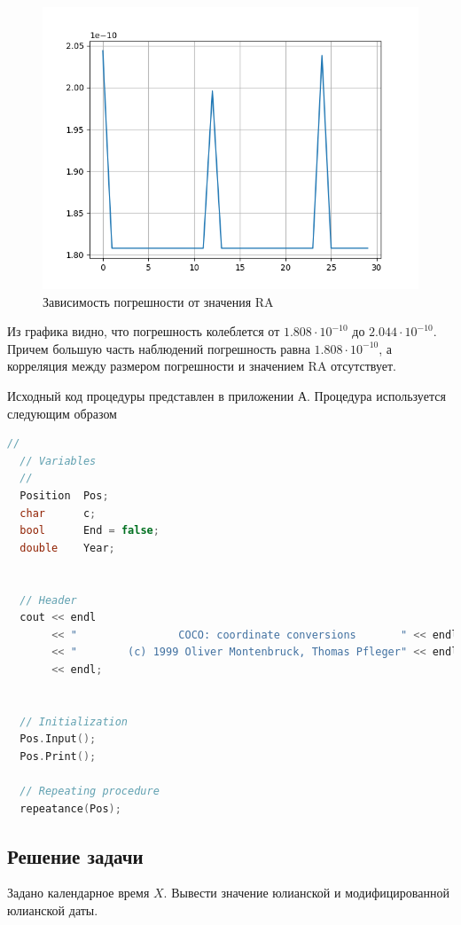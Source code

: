 \documentclass[14pt,a4paper]{extarticle}%
\begin{document}
\begin{figure}[H]
  \centering
  \includegraphics[scale=0.8]{Figure_1.png}
  \caption{Зависимость погрешности от значения RA}
  \label{fig:error}
\end{figure}

Из графика видно, что погрешность колеблется от $1.808\cdot10^{-10}$ до $2.044\cdot10^{-10}$.
Причем большую часть наблюдений погрешность равна $1.808\cdot10^{-10}$, а корреляция между
размером погрешности и значением RA отсутствует.

Исходный код процедуры представлен в приложении А.
Процедура используется следующим образом
\begin{lstlisting}[basicstyle=\small,language=c++]
  //
  // Variables
  //
  Position  Pos;
  char      c;
  bool      End = false;
  double    Year;

  
  // Header
  cout << endl
       << "                COCO: coordinate conversions       " << endl
       << "        (c) 1999 Oliver Montenbruck, Thomas Pfleger" << endl
       << endl;

  
  // Initialization   
  Pos.Input();
  Pos.Print();

  // Repeating procedure
  repeatance(Pos);
\end{lstlisting}

\clearpage

\subsection{Решение задачи}
Задано календарное время $X$. Вывести значение юлианской и модифицированной юлианской даты.
\end{document}
